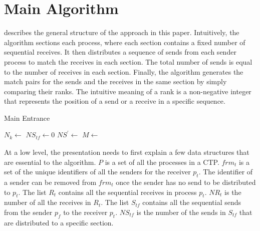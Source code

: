 \section{Main Algorithm}


 describes the general structure of the approach in this paper.
Intuitively, the algorithm sections each process, where each section contains a fixed number of sequential receives. It then distributes a sequence of sends from each sender process to match the receives in each section. The total number of sends is equal to the number of receives in each section. Finally, the algorithm generates the match pairs for the sends and the receives in the same section by simply comparing their ranks. The intuitive meaning of a rank is a non-negative integer that represents the position of a send or a receive in a specific sequence.

\begin{algorithm}
\caption{Main Entrance}\label{algo:main}
\begin{algorithmic}[1]
\State $N_k\gets$
\State $\mathit{NS_{tf}}\gets 0$
\EndFor
\State $\mathit{{NS}^\prime}\gets$
\State $M\gets$
\State {} 
\State {}
\EndIf
\EndFor
\EndWhile
\EndFor
\end{algorithmic}
\end{algorithm}

At a low level, the presentation needs to first explain a few data structures that are essential to the algorithm.
$\mathit{P}$ is a set of all the processes in a CTP. 
$frm_t$ is a set of the unique identifiers of all the senders for the receiver $p_t$. 
The identifier of a sender can be removed from $frm_t$ once the sender has no send to be distributed to $p_t$.
The list $R_t$ contains all the sequential receives in process $p_t$.
$\mathit{NR}_{t}$ is the number of all the receives in $R_t$.
The list $S_{tf}$ contains all the sequential sends from the sender $p_f$ to the receiver $p_t$. 
$\mathit{NS}_{tf}$ is the number of the sends in $S_{tf}$ that are distributed to a specific section.

